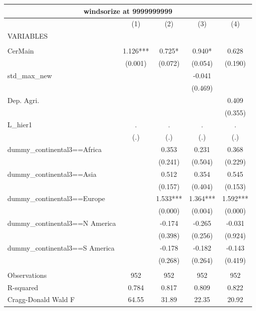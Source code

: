 \begin{tabular}{lcccc}
\multicolumn{5}{c}{windsorize at 9999999999} \\ \hline
 & (1) & (2) & (3) & (4) \\
VARIABLES &  &  &  &  \\ \hline
 &  &  &  &  \\
CerMain & 1.126*** & 0.725* & 0.940* & 0.628 \\
 & (0.001) & (0.072) & (0.054) & (0.190) \\
std\_max\_new &  &  & -0.041 &  \\
 &  &  & (0.469) &  \\
Dep. Agri. &  &  &  & 0.409 \\
 &  &  &  & (0.355) \\
L\_hier1 & . & . & . & . \\
 & (.) & (.) & (.) & (.) \\
dummy\_continental3==Africa &  & 0.353 & 0.231 & 0.368 \\
 &  & (0.241) & (0.504) & (0.229) \\
dummy\_continental3==Asia &  & 0.512 & 0.354 & 0.545 \\
 &  & (0.157) & (0.404) & (0.153) \\
dummy\_continental3==Europe &  & 1.533*** & 1.364*** & 1.592*** \\
 &  & (0.000) & (0.004) & (0.000) \\
dummy\_continental3==N America &  & -0.174 & -0.265 & -0.031 \\
 &  & (0.398) & (0.256) & (0.924) \\
dummy\_continental3==S America &  & -0.178 & -0.182 & -0.143 \\
 &  & (0.268) & (0.264) & (0.419) \\
 &  &  &  &  \\
Observations & 952 & 952 & 952 & 952 \\
R-squared & 0.784 & 0.817 & 0.809 & 0.822 \\
 Cragg-Donald Wald F & 64.55 & 31.89 & 22.35 & 20.92 \\ \hline
\end{tabular}
